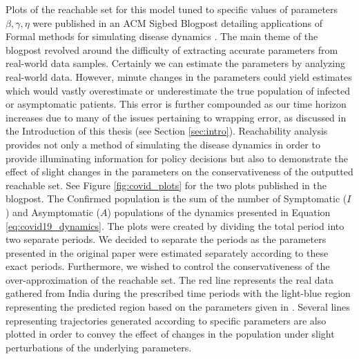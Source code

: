 Plots of the reachable set for this model tuned to specific values of parameters $\beta, \gamma, \eta$ were published in an ACM Sigbed Blogpost detailing applications of Formal methods for simulating disease dynamics \cite{bak2021covid}.
%
The main theme of the blogpost revolved around the difficulty of extracting accurate parameters from real-world data samples.
%
Certainly we can estimate the parameters by analyzing real-world data. However, minute changes in the parameters could yield estimates which would vastly overestimate or underestimate the true population of infected or asymptomatic patients.
%
This error is further compounded as our time horizon increases due to many of the issues pertaining to wrapping error, as discussed in the Introduction of this thesis (see Section \ref{sec:intro}).
%
Reachability analysis provides not only a method of simulating the disease dynamics in order to provide illuminating information for policy decisions but also to demonstrate the effect of slight changes in the parameters on the conservativeness of the outputted reachable set.
%
See Figure \ref{fig:covid_plots} for the two plots published in the blogpost. The Confirmed population is the sum of the number of Symptomatic ($I$) and Asymptomatic ($A$) populations of the dynamics presented in Equation \ref{eq:covid19_dynamics}. The plots were created by dividing the total period into two separate periods.
%
We decided to separate the periods as the parameters presented in the original paper \cite{ansumali2020modelling} were estimated separately according to these exact periods. Furthermore, we wished to control the conservativeness of the over-approximation of the reachable set.
%
The red line represents the real data gathered from India during the prescribed time periods with the light-blue region representing the predicted region based on the parameters given in \cite{ansumali2020modelling}.
%
Several lines representing trajectories generated according to specific parameters are also plotted in order to convey the effect of changes in the population under slight perturbations of the underlying parameters.
%
